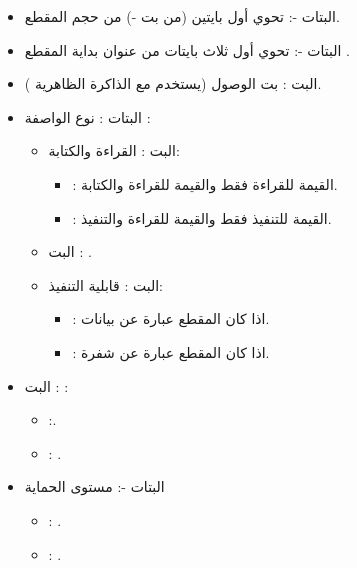 \documentclass[document.tex]{subfiles}
\begin{document}
\begin{itemize}
\item البتات -: تحوي أول بايتين (من بت  -) من حجم المقطع.
\item البتات -: تحوي أول ثلاث بايتات من عنوان بداية المقطع .
\item البت : بت الوصول  (يستخدم مع الذاكرة الظاهرية ).
\item البتات : نوع الواصفة :
\begin{itemize}
\item البت : القراءة والكتابة:
\begin{itemize}
\item {}: القيمة  للقراءة فقط والقيمة  للقراءة  والكتابة.
\item {}: القيمة  للتنفيذ فقط  والقيمة  للقراءة  والتنفيذ.
\end{itemize}

\item البت : .

\item البت : قابلية التنفيذ:
\begin{itemize}
\item {}: اذا كان المقطع عبارة عن بيانات.
\item {}: اذا كان المقطع عبارة عن شفرة.

\end{itemize}
\end{itemize}

\item البت : :
\begin{itemize}
\item {}:.
\item {}: .

\end{itemize}

\item البتات -: مستوى الحماية 
\begin{itemize}
\item {}: .
\item {}: .

\end{itemize}


\end{itemize}
\end{document}

